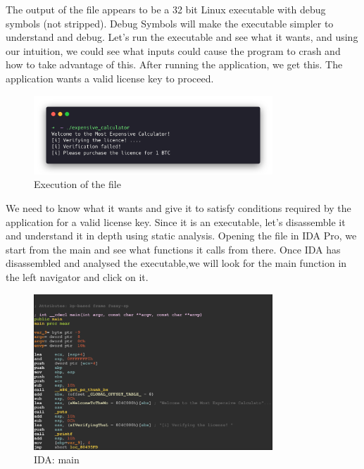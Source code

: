 The output of the file appears to be a 32 bit Linux executable with debug
symbols (not stripped). Debug Symbols will make the executable simpler to
understand and debug. Let's run the executable and see what it wants, and using
our intuition, we could see what inputs could cause the program to crash and how
to take advantage of this. After running the application, we get this. The
application wants a valid license key to proceed.
\begin{figure}[H]
  \centering
  \includegraphics[width=0.8\textwidth]{figures/run_file}
  \caption{Execution of the file}
  \label{f:run_file}
\end{figure}
We need to know what it wants and give it to satisfy conditions required by the
application for a valid license key. Since it is an executable, let's
disassemble it and understand it in depth using static analysis. Opening the
file in IDA Pro, we start from the main and see what functions it calls from
there. Once IDA has disassembled and analysed the executable,we will look for
the main function in the left navigator and click on it.

\begin{figure}[H]
  \centering
  \includegraphics[width=0.8\textwidth]{figures/ida-main}
  \caption{IDA: main}
  \label{f:ida-main}
\end{figure}

